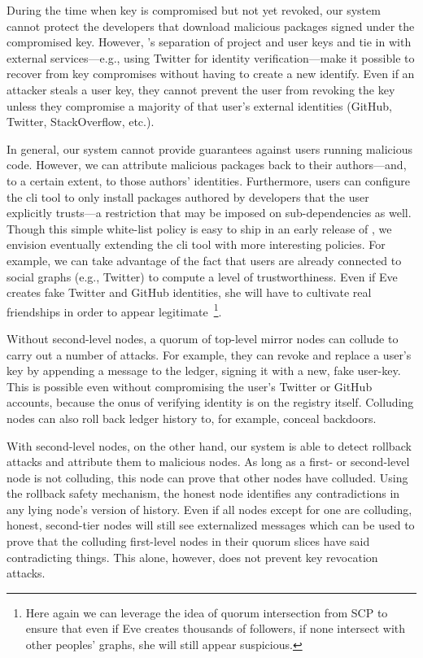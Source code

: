 During the time when key is compromised but not yet revoked, our system
cannot protect the developers that download malicious packages signed under
the compromised key. However, \spam's separation of project and user keys and
tie in with external services---e.g., using Twitter for identity
verification---make it possible to recover from key compromises without having
to create a new identify. Even if an attacker steals a user key, they cannot
prevent the user from revoking the key unless they compromise a majority of
that user's external identities (GitHub, Twitter, StackOverflow, etc.). 

In general, our system cannot provide guarantees against users running malicious
code. However, we can attribute malicious packages back to their authors---and,
to a certain extent, to those authors' identities. Furthermore, users can
configure the \spam{} cli tool to only install packages authored by developers
that the user explicitly trusts---a restriction that may be imposed on sub-dependencies
as well. Though this simple white-list policy is easy to ship in an early release of
\spam, we envision eventually extending the cli tool with more interesting policies.
For example, we can take advantage of the fact that \spam users are already
connected to social graphs (e.g., Twitter) to compute a level of trustworthiness.
Even if Eve creates fake Twitter and GitHub identities, she will have to
cultivate real friendships in order to appear legitimate~\footnote{Here again
  we can leverage the idea of quorum intersection from SCP to
  ensure that even if Eve creates thousands of followers, if none intersect
  with other peoples' graphs, she will still appear suspicious.}.

Without second-level nodes, a quorum of top-level mirror nodes can collude to carry out
a number of attacks. For example, they can revoke and replace a user's key by appending
a \replaceuserkey message to the ledger, signing it with a new, fake user-key.
This is possible even without compromising the user's Twitter or GitHub accounts,
because the onus of verifying identity is on the registry itself. Colluding
nodes can also roll back ledger history to, for example, conceal backdoors.

With second-level nodes, on the other hand, our system is able to detect
rollback attacks and attribute them to malicious nodes. As long as a first- or
second-level node is not colluding, this node can prove that other nodes have
colluded. Using the rollback safety mechanism, the honest node identifies any
contradictions in any lying node's version of history. Even if all nodes except
for one are colluding, honest, second-tier nodes will still see externalized
messages which can be used to prove that the colluding first-level nodes in
their quorum slices have said contradicting things.
This alone, however, does not prevent key revocation attacks.

